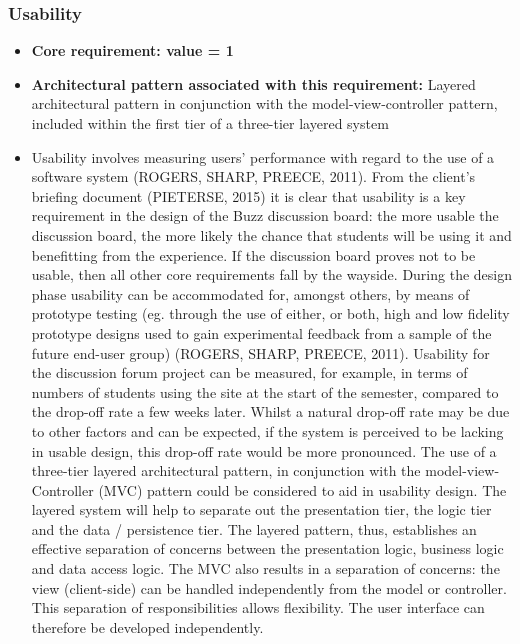 \documentclass[a4paper]{article}
\begin{document}
\subsubsection{Usability}
\begin{itemize}
	\item \textbf{Core requirement: value = 1}
	\item \textbf{Architectural pattern associated with this requirement:} Layered architectural pattern in conjunction with the model-view-controller pattern, included within the first tier of a three-tier layered system
	\item Usability involves measuring users’ performance with regard to the use of a software system (ROGERS, SHARP, PREECE, 2011). From the client’s briefing document (PIETERSE, 2015) it is clear that usability is a key requirement in the design of the Buzz discussion board: the more usable the discussion board, the more likely the chance that students will be using it and benefitting from the experience. If the discussion board proves not to be usable, then all other core requirements fall by the wayside. During the design phase usability can be accommodated for, amongst others, by means of prototype testing (eg. through the use of either, or both, high and low fidelity prototype designs used to gain experimental feedback from a sample of the future end-user group) (ROGERS, SHARP, PREECE, 2011). Usability for the discussion forum project can be measured, for example, in terms of numbers of students using the site at the start of the semester, compared to the drop-off rate a few weeks later. Whilst a natural drop-off rate may be due to other factors and can be expected, if the system is perceived to be lacking in usable design, this drop-off rate would be more pronounced. The use of a three-tier layered architectural pattern, in conjunction with the model-view-Controller (MVC) pattern could be considered to aid in usability design. The layered system will help to separate out the presentation tier, the logic tier and the data / persistence tier. The layered pattern, thus, establishes an effective separation of concerns between the presentation logic, business logic and data access logic. The MVC also results in a separation of concerns: the view (client-side) can be handled independently from the model or controller. This separation of responsibilities allows flexibility. The user interface can therefore be developed independently. 
\end{itemize}
\end{document}
